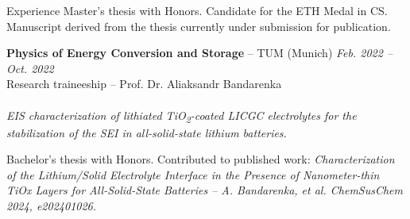 \documentclass{resume} %
\begin{document}
\begin{rSection}{Experience}
    Master's thesis with Honors. Candidate for the ETH Medal in CS. Manuscript derived from the thesis currently under submission for publication.

    {\bf Physics of Energy Conversion and Storage} -- TUM (Munich) \hfill {\em Feb. 2022 -- Oct. 2022} 
    \\ Research traineeship -- Prof. Dr. Aliaksandr Bandarenka \\
    \\ \textit{EIS characterization of lithiated TiO\textsubscript{2}-coated LICGC electrolytes for 
    the stabilization of the SEI in all-solid-state lithium batteries.}
    
    Bachelor's thesis with Honors. Contributed to published work: 
    \textit{Characterization of the Lithium/Solid Electrolyte Interface in the Presence of Nanometer-thin TiOx Layers for All-Solid-State Batteries -- A. Bandarenka, et al. ChemSusChem 2024, e202401026.}
\end{rSection}


\end{document}
